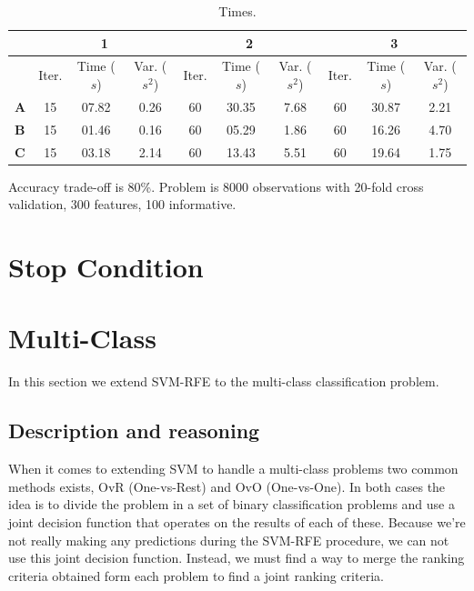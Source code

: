 \begin{table}[h]
    \centering
    \begin{tabular}{l | c c c | c c c | c c c }
        \toprule
        \multicolumn{1}{c}{} &\multicolumn{3}{c}{\textbf{1}} & \multicolumn{3}{c}{\textbf{2}} & \multicolumn{3}{c}{\textbf{3}}\\
        \midrule
        &Iter.&Time ($s$) &Var. ($s^2$)&Iter.&Time ($s$) &Var. ($s^2$)&Iter.&Time ($s$) &Var. ($s^2$) \\
        \midrule
        \textbf{A}&      15 & 07.82 & 0.26 &      60 & 30.35 & 7.68 &     60 & 30.87 & 2.21\\
        \textbf{B}&      15 & 01.46 & 0.16 &      60 & 05.29 & 1.86 &     60 & 16.26 & 4.70\\
        \textbf{C}&      15 & 03.18 & 2.14 &      60 & 13.43 & 5.51 &     60 & 19.64 & 1.75\\
        \bottomrule
        \end{tabular}
    \caption{Times.}
\end{table}

Accuracy trade-off is 80\%. Problem is 8000 observations with 20-fold cross validation, 300 features, 100 informative.


\section{Stop Condition}


\section{Multi-Class}

In this section we extend SVM-RFE to the multi-class classification problem.

\subsection{Description and reasoning}
\label{sec:stopCond.desc}

When it comes to extending SVM to handle a multi-class problems two common methods exists, OvR (One-vs-Rest) and OvO (One-vs-One). In both cases the idea is to divide the problem in a set of binary classification problems and use a joint decision function that operates on the results of each of these. Because we're not really making any predictions during the SVM-RFE procedure, we can not use this joint decision function. Instead, we must find a way to merge the ranking criteria obtained form each problem to find a joint ranking criteria.

